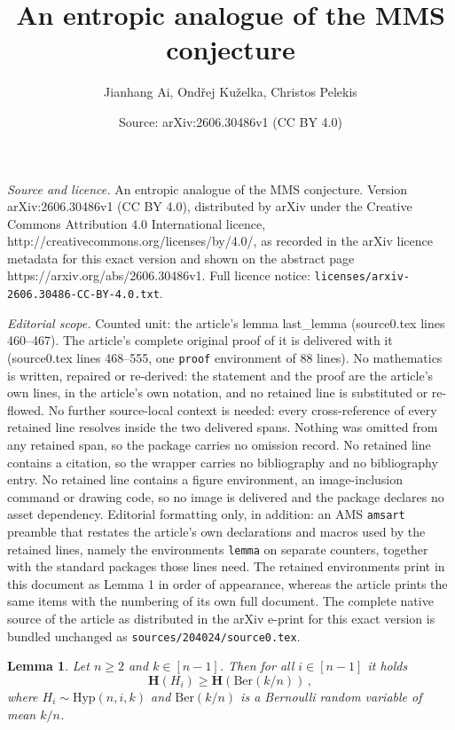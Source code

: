 \documentclass[10pt,a4paper]{amsart}
\title{An entropic analogue of the MMS conjecture}
\author{Jianhang Ai, Ond\v{r}ej Ku\v{z}elka, Christos Pelekis}
\date{Source: arXiv:2606.30486v1 (CC BY 4.0)}
\newtheorem{lemma}{Lemma}
\newcommand{\bh}{\mathbf{H}}
\begin{document}
\maketitle

\noindent\emph{Source and licence.} An entropic analogue of the MMS conjecture. Version arXiv:2606.30486v1 (CC BY 4.0), distributed by arXiv under the Creative Commons Attribution 4.0 International licence, http://creativecommons.org/licenses/by/4.0/, as recorded in the arXiv licence metadata for this exact version and shown on the abstract page https://arxiv.org/abs/2606.30486v1. Full licence notice: \texttt{licenses/arxiv-2606.30486-CC-BY-4.0.txt}.\par\smallskip

\noindent\textit{Editorial scope.} Counted unit: the article's lemma last\_lemma (source0.tex lines 460--467). The article's complete original proof of it is delivered with it (source0.tex lines 468--555, one \texttt{proof} environment of 88 lines). No mathematics is written, repaired or re-derived: the statement and the proof are the article's own lines, in the article's own notation, and no retained line is substituted or re-flowed.  No further source-local context is needed: every cross-reference of every retained line resolves inside the two delivered spans.  Nothing was omitted from any retained span, so the package carries no omission record.  No retained line contains a citation, so the wrapper carries no bibliography and no bibliography entry.  No retained line contains a figure environment, an image-inclusion command or drawing code, so no image is delivered and the package declares no asset dependency.  Editorial formatting only, in addition: an AMS \texttt{amsart} preamble that restates the article's own declarations and macros used by the retained lines, namely the environments \texttt{lemma} on separate counters, together with the standard packages those lines need.  The retained environments print in this document as Lemma 1 in order of appearance, whereas the article prints the same items with the numbering of its own full document.  The complete native source of the article as distributed in the arXiv e-print for this exact version is bundled unchanged as \texttt{sources/204024/source0.tex}.
\begin{lemma}\label{last_lemma}
Let $n\ge 2$ and $k\in [n-1]$. Then for all $i\in [n-1]$ it holds 
\[
\bh(H_i) \ge \bh(\text{Ber}(k/n)) \, ,
\]
where $H_i\sim\text{Hyp}(n,i,k)$ and 
$\text{Ber}(k/n)$ is a Bernoulli random variable of mean $k/n$. 
\end{lemma}
\end{document}
